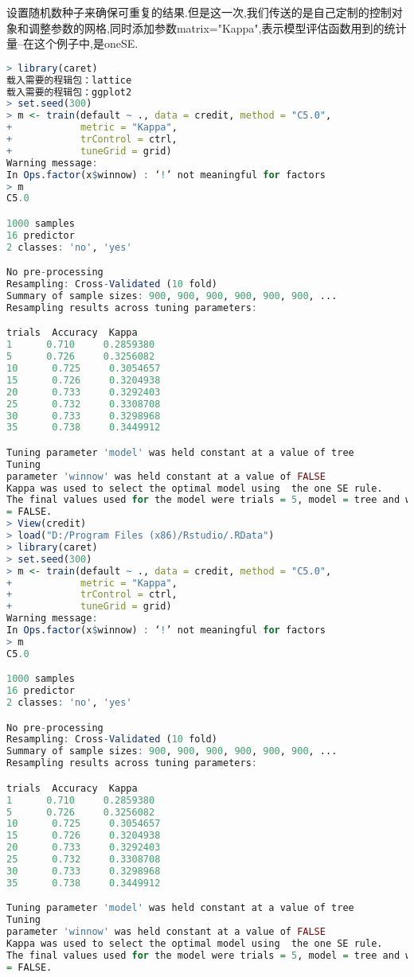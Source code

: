 \documentclass[11pt,a4paper,oneside]{book}
\begin{document}
设置随机数种子来确保可重复的结果.但是这一次,我们传送的是自己定制的控制对象和调整参数的网格,同时添加参数matrix="Kappa",表示模型评估函数用到的统计量--在这个例子中,是oneSE.
\begin{lstlisting}[language=r]
> library(caret)
载入需要的程辑包：lattice
载入需要的程辑包：ggplot2
> set.seed(300)
> m <- train(default ~ ., data = credit, method = "C5.0",
+            metric = "Kappa",
+            trControl = ctrl,
+            tuneGrid = grid)
Warning message:
In Ops.factor(x$winnow) : ‘!’ not meaningful for factors
> m
C5.0 

1000 samples
16 predictor
2 classes: 'no', 'yes' 

No pre-processing
Resampling: Cross-Validated (10 fold) 
Summary of sample sizes: 900, 900, 900, 900, 900, 900, ... 
Resampling results across tuning parameters:

trials  Accuracy  Kappa    
1      0.710     0.2859380
5      0.726     0.3256082
10      0.725     0.3054657
15      0.726     0.3204938
20      0.733     0.3292403
25      0.732     0.3308708
30      0.733     0.3298968
35      0.738     0.3449912

Tuning parameter 'model' was held constant at a value of tree
Tuning
parameter 'winnow' was held constant at a value of FALSE
Kappa was used to select the optimal model using  the one SE rule.
The final values used for the model were trials = 5, model = tree and winnow
= FALSE.
> View(credit)
> load("D:/Program Files (x86)/Rstudio/.RData")
> library(caret)
> set.seed(300)
> m <- train(default ~ ., data = credit, method = "C5.0",
+            metric = "Kappa",
+            trControl = ctrl,
+            tuneGrid = grid)
Warning message:
In Ops.factor(x$winnow) : ‘!’ not meaningful for factors
> m
C5.0 

1000 samples
16 predictor
2 classes: 'no', 'yes' 

No pre-processing
Resampling: Cross-Validated (10 fold) 
Summary of sample sizes: 900, 900, 900, 900, 900, 900, ... 
Resampling results across tuning parameters:

trials  Accuracy  Kappa    
1      0.710     0.2859380
5      0.726     0.3256082
10      0.725     0.3054657
15      0.726     0.3204938
20      0.733     0.3292403
25      0.732     0.3308708
30      0.733     0.3298968
35      0.738     0.3449912

Tuning parameter 'model' was held constant at a value of tree
Tuning
parameter 'winnow' was held constant at a value of FALSE
Kappa was used to select the optimal model using  the one SE rule.
The final values used for the model were trials = 5, model = tree and winnow
= FALSE.
\end{lstlisting}
\end{document}
